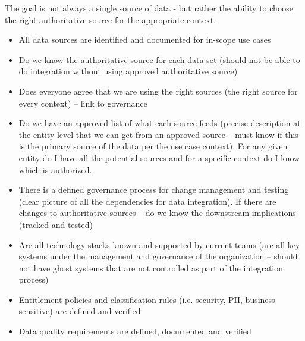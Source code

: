 \kgmmcorequestionssection

The goal is not always a single source of data - but rather the ability to choose the right authoritative source
for the appropriate context.

\kgmmscoringlevelOne

\begin{itemize}[leftmargin=1.5in,font=\bfseries]
    \item All data sources are identified and documented for in-scope use cases
    \item Do we know the authoritative source for each data set (should not be able to do integration without
          using approved authoritative source)
    \item Does everyone agree that we are using the right sources (the right source for every context) --
          link to governance
    \item Do we have an approved list of what each source feeds (precise description at the entity level that
          we can get from an approved source -- must know if this is the primary source of the data per the
          use case context).
          For any given entity do I have all the potential sources and for a specific context do I know which
          is authorized.
    \item There is a defined governance process for change management and testing (clear picture of all the
          dependencies for data integration).
          If there are changes to authoritative sources -- do we know the downstream implications (tracked and tested)
    \item Are all technology stacks known and supported by current teams (are all key systems under the
          management and governance of the organization -- should not have ghost systems that are not controlled
          as part of the integration process)
    \item Entitlement policies and classification rules (i.e. security, PII, business sensitive) are
          defined and verified
    \item Data quality requirements are defined, documented and verified
\end{itemize}

\kgmmscoringlevelTwo

